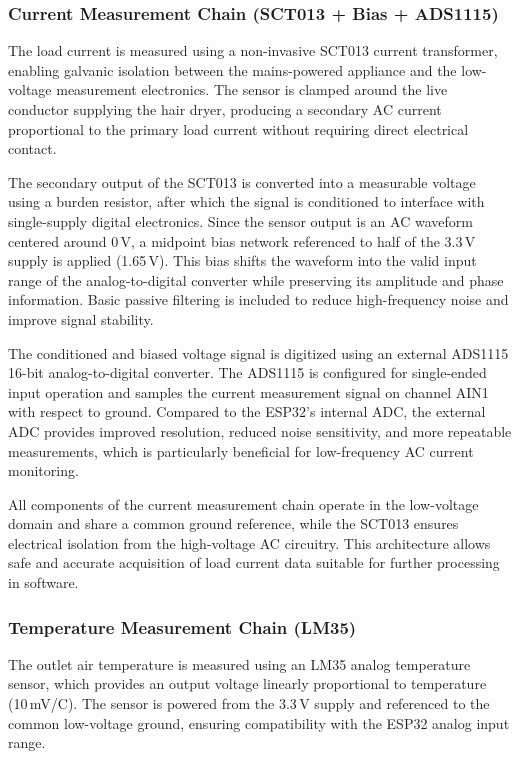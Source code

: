\documentclass[11pt,a4paper]{article}
\begin{document}
\subsubsection*{Current Measurement Chain (SCT013 + Bias + ADS1115)}

The load current is measured using a non-invasive SCT013 current transformer, enabling galvanic isolation between the mains-powered appliance and the low-voltage measurement electronics. The sensor is clamped around the live conductor supplying the hair dryer, producing a secondary AC current proportional to the primary load current without requiring direct electrical contact.

The secondary output of the SCT013 is converted into a measurable voltage using a burden resistor, after which the signal is conditioned to interface with single-supply digital electronics. Since the sensor output is an AC waveform centered around 0\,V, a midpoint bias network referenced to half of the 3.3\,V supply is applied (1.65\,V). This bias shifts the waveform into the valid input range of the analog-to-digital converter while preserving its amplitude and phase information. Basic passive filtering is included to reduce high-frequency noise and improve signal stability.

The conditioned and biased voltage signal is digitized using an external ADS1115 16-bit analog-to-digital converter. The ADS1115 is configured for single-ended input operation and samples the current measurement signal on channel AIN1 with respect to ground. Compared to the ESP32’s internal ADC, the external ADC provides improved resolution, reduced noise sensitivity, and more repeatable measurements, which is particularly beneficial for low-frequency AC current monitoring.

All components of the current measurement chain operate in the low-voltage domain and share a common ground reference, while the SCT013 ensures electrical isolation from the high-voltage AC circuitry. This architecture allows safe and accurate acquisition of load current data suitable for further processing in software.

\subsubsection*{Temperature Measurement Chain (LM35)}

The outlet air temperature is measured using an LM35 analog temperature sensor, which provides an output voltage linearly proportional to temperature (10\,mV/\textdegree C). The sensor is powered from the 3.3\,V supply and referenced to the common low-voltage ground, ensuring compatibility with the ESP32 analog input range.
\end{document}
